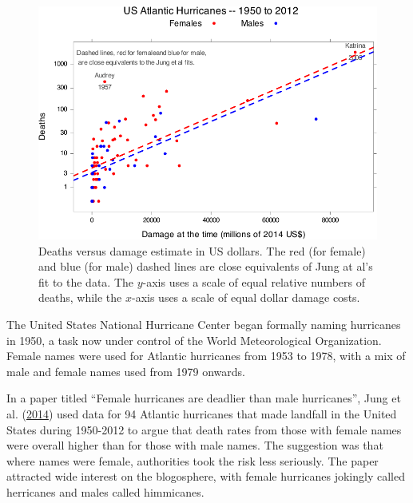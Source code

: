 \documentclass[
  10pt,
  b5paper]{book}
\begin{document}
\begin{figure}[H]

{\centering \includegraphics[width=0.8\linewidth]{08-observational_files/figure-latex/hurricanes1-1} 

}

\caption{Deaths versus damage estimate in US dollars. The red (for female) 
and blue (for male) dashed lines are close equivalents of Jung at al's fit
to the data. The $y$-axis uses a scale of equal relative numbers of deaths, 
while the $x$-axis uses a scale of equal dollar damage costs.}\label{fig:hurricanes1}
\end{figure}

The United States National Hurricane Center began formally naming
hurricanes in 1950, a task now under control of the
World Meteorological Organization. Female names were used for
Atlantic hurricanes from 1953 to 1978, with a mix of male and
female names used from 1979 onwards.

In a paper titled ``Female hurricanes are deadlier than male
hurricanes'', Jung et al. (\protect\hyperlink{ref-jung2014female}{2014}) used data for 94 Atlantic hurricanes
that made landfall in the United States during 1950-2012 to argue
that death rates from those with female names were overall higher
than for those with male names. The suggestion was that where names
were female, authorities took the risk less seriously. The paper
attracted wide interest on the blogosphere, with female hurricanes
jokingly called herricanes and males called himmicanes.
\end{document}
